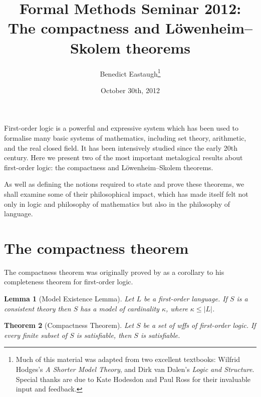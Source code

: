 \documentclass[10pt, a4paper, oneside]{article}
\title{Formal Methods Seminar 2012:\\
       The compactness and Löwenheim--Skolem theorems}
\author{Benedict Eastaugh\footnote{Much of this material was adapted from two
        excellent textbooks: Wilfrid Hodges's \emph{A Shorter Model Theory}, and
        Dirk van Dalen's \emph{Logic and Structure}. Special thanks are due to
        Kate Hodesdon and Paul Ross for their invaluable input and feedback.}}
\date{October 30th, 2012}
\newtheorem{thm}{Theorem}[section]
\theoremstyle{definition}
\theoremstyle{remark}
\theoremstyle{plain}
\newtheorem{lem}[thm]{Lemma}
\theoremstyle{plain}
\begin{document}
\maketitle

First-order logic is a powerful and expressive system which has been used to
formalise many basic systems of mathematics, including set theory, arithmetic,
and the real closed field. It has been intensively studied since the early 20th
century. Here we present two of the most important metalogical results about
first-order logic: the compactness and Löwenheim--Skolem theorems.

As well as defining the notions required to state and prove these theorems, we
shall examine some of their philosophical impact, which has made itself felt not
only in logic and philosophy of mathematics but also in the philosophy of
language.

\section{The compactness theorem}

The compactness theorem was originally proved by \citet{godel1930} as a
corollary to his completeness theorem for first-order logic.

\begin{lem}[Model Existence Lemma]
    \label{lem:model_existence}
    Let $L$ be a first-order language. If $S$ is a consistent theory then $S$
    has a model of cardinality $\kappa$, where $\kappa \leq |L|$.
\end{lem}

\begin{thm}[Compactness Theorem]
    \label{thm:compactness}
    Let $S$ be a set of wffs of first-order logic. If every finite subset of $S$
    is satisfiable, then $S$ is satisfiable.
\end{thm}
\end{document}
